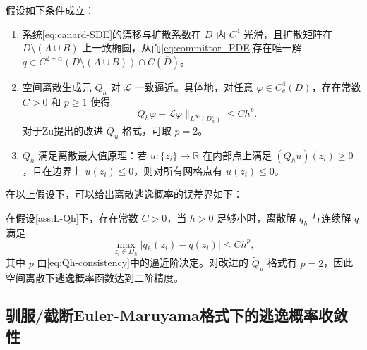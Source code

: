 	\begin{assumption}\label{ass:L-Qh}
		假设如下条件成立：
		\begin{enumerate}
			\item 系统\eqref{eq:canard-SDE}的漂移与扩散系数在 \(D\) 内 \(C^{4}\) 光滑，且扩散矩阵在 \(D\setminus(A\cup B)\) 上一致椭圆，从而\eqref{eq:committor_PDE}存在唯一解 \(q\in C^{2+\alpha}(D\setminus(A\cup B))\cap C(\overline{D})\)。
			
			\item 空间离散生成元 \(Q_h\) 对 \(\mathcal{L}\) 一致逼近。具体地，对任意 \(\varphi\in C_c^{4}(D)\)，存在常数 \(C>0\) 和 \(p\ge1\) 使得
			\begin{equation}\label{eq:Qh-consistency}
				\big\| Q_h\varphi - \mathcal{L}\varphi \big\|_{L^\infty(D_h^\circ)}
				\le C h^p.
			\end{equation}
			对于Zu\cite{zu2023random}提出的改进 \(\widetilde{Q}_u\) 格式，可取 \(p=2\)。
			
			\item \(Q_h\) 满足离散最大值原理：若 \(u:\{z_i\}\to\mathbb{R}\) 在内部点上满足 \((Q_h u)(z_i)\ge0\)，且在边界上 \(u(z_i)\le 0\)，则对所有网格点有 \(u(z_i)\le0\)。
		\end{enumerate}
	\end{assumption}
	
	在以上假设下，可以给出离散逃逸概率的误差界如下：
	
	\begin{theorem}\label{thm:Qh-committor-convergence}
		在假设\ref{ass:L-Qh}下，存在常数 \(C>0\)，当 \(h>0\) 足够小时，离散解 \(q_h\) 与连续解 \(q\) 满足
		\begin{equation}\label{eq:Qh-error}
			\max_{z_i\in D_h} \big|q_h(z_i)-q(z_i)\big|
			\le C h^p,
		\end{equation}
		其中 \(p\) 由\eqref{eq:Qh-consistency}中的逼近阶决定。对改进的 \(\widetilde{Q}_u\) 格式有 \(p=2\)，因此空间离散下逃逸概率函数达到二阶精度。
	\end{theorem}
	
	
	\subsection{驯服/截断Euler-Maruyama格式下的逃逸概率收敛性}
	
